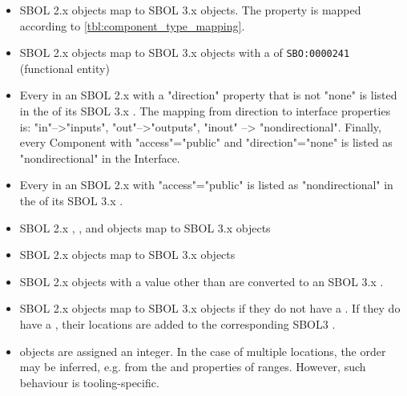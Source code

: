 \begin{itemize}
    \item SBOL 2.x  objects map to SBOL 3.x  objects.  The  property is mapped according to  \autoref{tbl:component_type_mapping}.
    \item SBOL 2.x  objects map to SBOL 3.x  objects with a  of \texttt{SBO:0000241} (functional entity)
    \item Every  in an SBOL 2.x  with a "direction" property that is not "none" is listed in the  of its SBOL 3.x . The mapping from direction to interface properties is: "in"-->"inputs", "out"-->"outputs", "inout" --> "nondirectional". Finally, every Component with "access"="public" and "direction"="none" is listed as "nondirectional" in the Interface.
    \item Every  in an SBOL 2.x  with "access"="public" is listed as "nondirectional" in the  of its SBOL 3.x .
    \item SBOL 2.x , , and  objects map to SBOL 3.x  objects
    \item SBOL 2.x  objects map to SBOL 3.x  objects
    \item SBOL 2.x  objects with a value other than  are converted to an SBOL 3.x . 
    \item SBOL 2.x  objects map to SBOL 3.x  objects if they do not have a . If they do have a , their locations are added to the corresponding SBOL3 .
    \item {} objects are assigned an  integer.  In the case of multiple locations, the order may be inferred, e.g. from the  and  properties of ranges.  However, such behaviour is tooling-specific.
\end{itemize}

